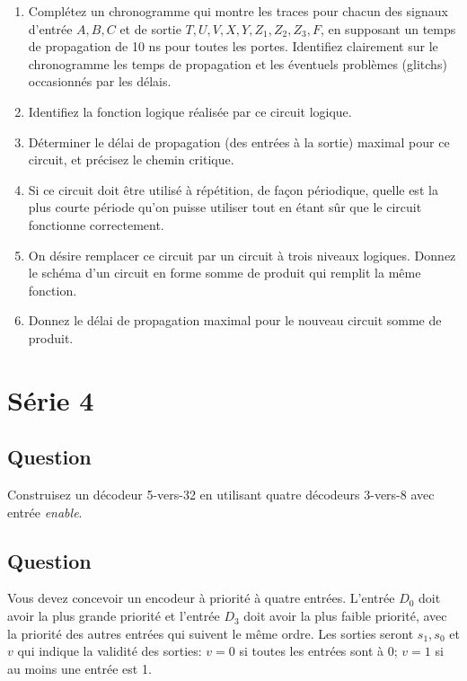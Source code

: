 \documentclass[letter, oneside]{book}
\begin{document}
\begin{enumerate}
\item Complétez un chronogramme qui montre les traces pour chacun des
signaux d'entrée \(A, B, C\) et de sortie \(T, U, V, X, Y, Z_1,
       Z_2, Z_3, F\), en supposant un temps de propagation de 10 ns
pour toutes les portes. Identifiez clairement sur le
chronogramme les temps de propagation et les éventuels problèmes
(glitchs) occasionnés par les délais.

\item Identifiez la fonction logique réalisée par ce circuit logique.

\item Déterminer le délai de propagation (des entrées à la sortie)
maximal pour ce circuit, et précisez le chemin critique.

\item Si ce circuit doit être utilisé à répétition, de façon périodique,
quelle est la plus courte période qu'on puisse utiliser tout en
étant sûr que le circuit fonctionne correctement.

\item On désire remplacer ce circuit par un circuit à trois niveaux
logiques. Donnez le schéma d'un circuit en forme somme de produit
qui remplit la même fonction.

\item Donnez le délai de propagation maximal pour le nouveau circuit
somme de produit.
\end{enumerate}

\chapter*{Série 4}
\label{sec:orgd10cc80}
\section*{Question}
\label{sec:orgb84147c}
Construisez un décodeur 5-vers-32 en utilisant quatre décodeurs
  3-vers-8 avec entrée \emph{enable}.

\section*{Question}
\label{sec:orge2469f5}
Vous devez concevoir un encodeur à priorité à quatre
  entrées. L'entrée \(D_0\) doit avoir la plus grande priorité et
  l'entrée \(D_3\) doit avoir la plus faible priorité, avec la
  priorité des autres entrées qui suivent le même ordre. Les sorties
  seront \(s_1, s_0\) et \(v\) qui indique la validité des sorties:
  \(v=0\) si toutes les entrées sont à 0; \(v=1\) si au moins une
  entrée est 1.
\end{document}
